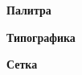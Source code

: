 \textbf{Палитра}

\noindent
\begin{minipage}{\linewidth}
\end{minipage}
\bigskip

\textbf{Типографика}

\noindent
\begin{minipage}{\linewidth}
\end{minipage}
\bigskip

\textbf{Сетка}

